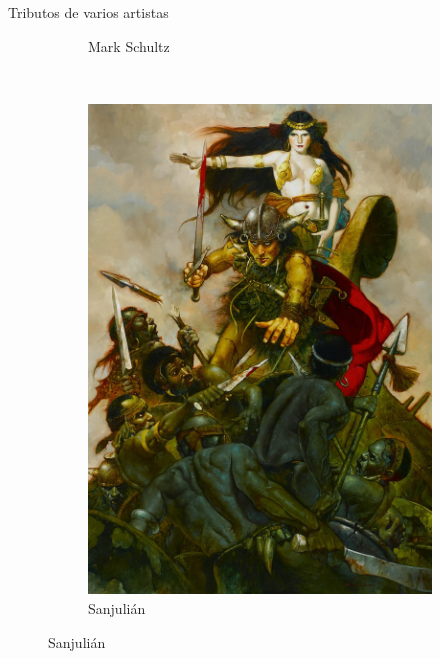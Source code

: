 \begin{frame}{Tributos de varios artistas}
\begin{figure}[htp]
\begin{subfigure}[b]{0.4\textwidth}
			\caption{Mark Schultz}
		\end{subfigure}
		~
		\begin{subfigure}[b]{0.22\textwidth}
			\includegraphics[width=\textwidth]{img/tributos/SanJullian}
			\caption{Sanjulián}
		\end{subfigure}
	\end{figure}
\end{frame}
\note[itemize]{
	\item
}

